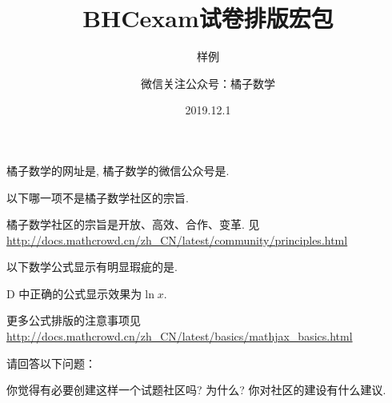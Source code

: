 \documentclass[a4paper,answers]{BHCexam}
\begin{document}

\title{BHCexam试卷排版宏包}

\subtitle{样例}


\author{微信关注公众号：橘子数学}

\date{2019.12.1}

\maketitle

\begin{groups}

\begin{questions}[s]

\question[30] 橘子数学的网址是, 橘子数学的微信公众号是.

\end{questions}

\begin{questions}[s]

\question[30] 以下哪一项不是橘子数学社区的宗旨.

\begin{solution}{4cm}
\method 橘子数学社区的宗旨是开放、高效、合作、变革.
\method 见 \url{http://docs.mathcrowd.cn/zh_CN/latest/community/principles.html}
\end{solution}

\question[40] 以下数学公式显示有明显瑕疵的是.

\begin{solution}{4cm}
\methodonly D 中正确的公式显示效果为$\ln{x}$.

更多公式排版的注意事项见 \url{http://docs.mathcrowd.cn/zh_CN/latest/basics/mathjax_basics.html}
\end{solution}
\end{questions}

\begin{questions}[st]
\question[30] 请回答以下问题：
\begin{subquestions}
    \subquestion 你觉得有必要创建这样一个试题社区吗? 为什么?
    \subquestion 你对社区的建设有什么建议.
\end{subquestions}


\end{questions}
\end{groups}
\end{document}
